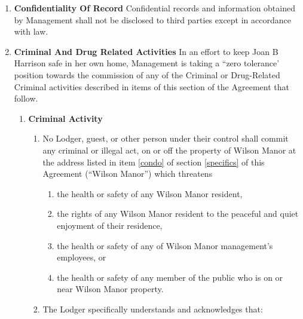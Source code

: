 \documentclass[12pt,letterpaper]{article}
\newcommand{\lodger}{Lodger}
\newcommand{\mom}{Joan B Harrison}
\newcommand{\management}{Management}
\newcommand{\condo}{Wilson Manor}
\newcommand{\lemail}{Lodger Email}
\newcommand{\paymenttime}{Payment Notification Time-Date}
\begin{document}
\begin{enumerate}
\begin{enumerate}
\begin{enumerate}
					\item For reasons of security and convenience, \management{} shall not accept cash payments. Unless otherwise directed in writing by \management{}, all payments shall be made through Venmo's website https://venmo.com/, one of Venmo's apps for Android/iOS, or by any other method Venmo provides. 
				\end{enumerate}
			\item \textbf{Receipt} \quad \management{} will provide receipt of payment via one of the \lemail{} that is set forth in item \ref{lemail} of section \ref{specifics} of this Agreement{}, and record payment was received at the \paymenttime{}. 
		\end{enumerate}
	\item \textbf{Confidentiality Of Record} \quad 
		Confidential records and information obtained by \management{} shall not be disclosed to third parties except in accordance with law. 
	\item \textbf{Criminal And Drug Related Activities} \quad 
		In an effort to keep \mom{} safe in her own home, \management{} is taking a ``zero tolerance' position towards the commission of any of the Criminal or Drug-Related Criminal activities described in items of this section of the Agreement that follow. 
		\begin{enumerate} 
			\item \textbf{Criminal Activity} \quad \label{criminal}
				\begin{enumerate}
					\item No \lodger{}, guest, or other person under their control shall commit any criminal or illegal act, on or off the property of \condo{} at the address listed in item \ref{condo} of section \ref{specifics} of this Agreement (``\condo{}'') which threatens 
						\begin{enumerate} 
							\item the health or safety of any \condo{} resident, 
							\item the rights of any \condo{} resident to the peaceful and quiet enjoyment of their residence, 
							\item the health or safety of any of \condo{} management's employees, or 
							\item the health or safety of any member of the public who is on or near \condo{} property. 
						\end{enumerate} 
					\item The \lodger{} specifically understands and acknowledges that: 

\end{enumerate}
\end{enumerate}
\end{enumerate}
\end{document}
